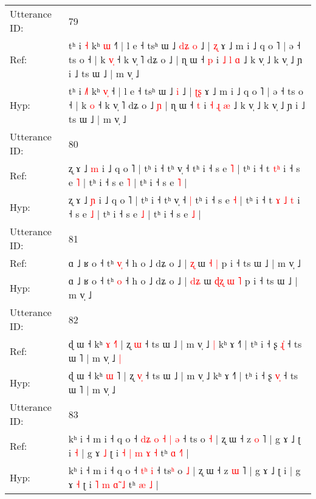 \documentclass[10pt]{article}
\DeclareRobustCommand{\hl}[1]{{\textcolor{red}{#1}}}
\begin{document}
\begin{longtable}{ll}
 \\
\midrule
Utterance ID: & 79 \\
Ref: & tʰ i \hl{}\hl{˧} kʰ \hl{}\hl{ɯ} ˧\hl{˥} | l e ˧ tsʰ ɯ ˩\hl{ }\hl{d}\hl{ʑ} \hl{o} ˩ | \hl{}\hl{ʐ} ɤ ˩ m i ˩ q o ˥ | ə ˧ ts o ˧ | k \hl{v}\hl{̩} ˧ k v̩ ˥ dʑ o ˩\hl{}\hl{} | ɳ ɯ ˧ \hl{p} i \hl{˩} \hl{l} \hl{ɑ} ˩ k v̩ ˩ k v̩ ˩ ɲ i ˩ ts ɯ ˩ | m v̩ ˩
 \\
Hyp: & tʰ i \hl{˩}\hl{˥} kʰ \hl{v}\hl{̩} ˧\hl{} | l e ˧ tsʰ ɯ ˩\hl{}\hl{}\hl{} \hl{i} ˩ | \hl{ʈ}\hl{ʂ} ɤ ˩ m i ˩ q o ˥ | ə ˧ ts o ˧ | k \hl{}\hl{o} ˧ k v̩ ˥ dʑ o ˩\hl{ }\hl{ɲ} | ɳ ɯ ˧ \hl{t} i \hl{˧} \hl{ɻ} \hl{æ} ˩ k v̩ ˩ k v̩ ˩ ɲ i ˩ ts ɯ ˩ | m v̩ ˩
 \\
\midrule
Utterance ID: & 80 \\
Ref: & ʐ ɤ ˩ \hl{m} i ˩ q o ˥ | tʰ i ˧ tʰ v̩ ˧\hl{}\hl{} tʰ i ˧ s e \hl{˥} | tʰ i ˧ t\hl{}\hl{} \hl{}\hl{t}\hl{ʰ} i ˧ s e \hl{˥} | tʰ i ˧ s e \hl{˥} | tʰ i ˧ s e \hl{˥} |
 \\
Hyp: & ʐ ɤ ˩ \hl{ɲ} i ˩ q o ˥ | tʰ i ˧ tʰ v̩ ˧\hl{ }\hl{|} tʰ i ˧ s e \hl{˧} | tʰ i ˧ t\hl{ }\hl{ɤ} \hl{˩}\hl{ }\hl{t} i ˧ s e \hl{˩} | tʰ i ˧ s e \hl{˩} | tʰ i ˧ s e \hl{˩} |
 \\
\midrule
Utterance ID: & 81 \\
Ref: & ɑ ˩ ʁ o ˧ tʰ \hl{v}\hl{̩} ˧ h o ˩ dʑ o ˩ | \hl{}\hl{ʐ} ɯ\hl{}\hl{}\hl{} \hl{˧} \hl{|} p i ˧ ts ɯ ˩ | m v̩ ˩
 \\
Hyp: & ɑ ˩ ʁ o ˧ tʰ \hl{}\hl{o} ˧ h o ˩ dʑ o ˩ | \hl{d}\hl{ʑ} ɯ\hl{ }\hl{ɖ}\hl{ʐ} \hl{ɯ} \hl{˥} p i ˧ ts ɯ ˩ | m v̩ ˩
 \\
\midrule
Utterance ID: & 82 \\
Ref: & ɖ ɯ ˧ kʰ \hl{ɤ} \hl{˧}˥ | ʐ \hl{}\hl{ɯ} ˧ ts ɯ ˩ | m v̩ ˩\hl{ }\hl{|} kʰ ɤ ˧˥ | tʰ i ˧ ʂ \hl{ɻ}\hl{̍} ˧ ts ɯ ˥ | m v̩ ˩\hl{ }\hl{|}
 \\
Hyp: & ɖ ɯ ˧ kʰ \hl{ɯ} \hl{}˥ | ʐ \hl{v}\hl{̩} ˧ ts ɯ ˩ | m v̩ ˩\hl{}\hl{} kʰ ɤ ˧˥ | tʰ i ˧ ʂ \hl{v}\hl{̩} ˧ ts ɯ ˥ | m v̩ ˩\hl{}\hl{}
 \\
\midrule
Utterance ID: & 83 \\
Ref: & kʰ i ˧ m i ˧ q o ˧\hl{ }\hl{d}\hl{ʑ}\hl{ }\hl{o} \hl{˧}\hl{ }\hl{|} \hl{ə} ˧ ts\hl{} o \hl{˧} | ʐ ɯ ˧ z \hl{o} ˥ | g ɤ ˩ ʈ i\hl{ }\hl{˧} | g ɤ \hl{˩} ʈ i \hl{˧} \hl{|} \hl{m}\hl{ }\hl{ɤ} \hl{˧} tʰ \hl{ɑ} \hl{˧}\hl{˥} |
 \\
Hyp: & kʰ i ˧ m i ˧ q o ˧\hl{}\hl{}\hl{}\hl{}\hl{} \hl{}\hl{t}\hl{ʰ} \hl{i} ˧ ts\hl{ʰ} o \hl{˩} | ʐ ɯ ˧ z \hl{ɯ} ˥ | g ɤ ˩ ʈ i\hl{}\hl{} | g ɤ \hl{˧} ʈ i \hl{˥} \hl{m} \hl{}\hl{ɑ}\hl{̃} \hl{˩} tʰ \hl{æ} \hl{}\hl{˩} |
 \\

\end{longtable}
\end{document}
